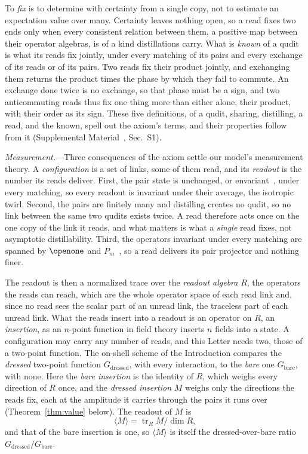 \documentclass[aps,prl,reprint,superscriptaddress,longbibliography,nofootinbib,floatfix]{revtex4-2}
\theoremstyle{definition}
\newcommand{\tr}{\operatorname{tr}}
\begin{document}
To \emph{fix} is to determine with certainty from a single copy, not to estimate an expectation value over many. Certainty leaves nothing open, so a read fixes two ends only when every consistent relation between them, a positive map between their operator algebras, is of a kind distillations carry. What is \emph{known} of a qudit is what its reads fix jointly, under every matching of its pairs and every exchange of its reads or of its pairs. Two reads fix their product jointly, and exchanging them returns the product times the phase by which they fail to commute. An exchange done twice is no exchange, so that phase must be a sign, and two anticommuting reads thus fix one thing more than either alone, their product, with their order as its sign. These five definitions, of a qudit, sharing, distilling, a read, and the known, spell out the axiom's terms, and their properties follow from it (Supplemental Material~\cite{SM}, Sec.~S1).

\emph{Measurement.}---Three consequences of the axiom settle our model's measurement theory. A \emph{configuration} is a set of links, some of them read, and its \emph{readout} is the number its reads deliver. First, the pair state is unchanged, or envariant~\cite{zurek2003}, under every matching, so every readout is invariant under their average, the isotropic twirl. Second, the pairs are finitely many and distilling creates no qudit, so no link between the same two qudits exists twice. A read therefore acts once on the one copy of the link it reads, and what matters is what a \emph{single} read fixes, not asymptotic distillability. Third, the operators invariant under every matching are spanned by $\openone$ and $P_{m}$~\cite{horodecki1999}, so a read delivers its pair projector and nothing finer.

The readout is then a normalized trace over the \emph{readout algebra} $R$, the operators the reads can reach, which are the whole operator space of each read link and, since no read sees the scalar part of an unread link, the traceless part of each unread link. What the reads insert into a readout is an operator on $R$, an \emph{insertion}, as an $n$-point function in field theory inserts $n$ fields into a state. A configuration may carry any number of reads, and this Letter needs two, those of a two-point function. The on-shell scheme of the Introduction compares the \emph{dressed} two-point function $G_{\mathrm{dressed}}$, with every interaction, to the \emph{bare} one $G_{\mathrm{bare}}$, with none. Here the \emph{bare insertion} is the identity of $R$, which weighs every direction of $R$ once, and the \emph{dressed insertion} $M$ weighs only the directions the reads fix, each at the amplitude it carries through the pairs it runs over (Theorem~\ref{thm:value} below). The readout of $M$ is~\cite{SM}
\begin{equation}
\langle M\rangle = \tr_{R}M/\dim R,
\label{eq:readout}
\end{equation}
and that of the bare insertion is one, so $\langle M\rangle$ is itself the dressed-over-bare ratio $G_{\mathrm{dressed}}/G_{\mathrm{bare}}$.
\end{document}

